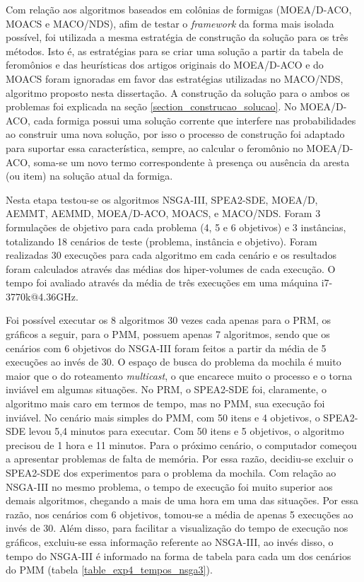 Com relação aos algoritmos baseados em colônias de formigas (MOEA/D-ACO, MOACS e MACO/NDS), afim de testar o \textit{framework} da forma mais isolada possível, foi utilizada a mesma estratégia de construção da solução para os três métodos. Isto é, as estratégias para se criar uma solução a partir da tabela de feromônios e das heurísticas dos artigos originais do MOEA/D-ACO e do MOACS foram ignoradas em favor das estratégias utilizadas no MACO/NDS, algoritmo proposto nesta dissertação. A construção da solução para o ambos os problemas foi explicada na seção \ref{section_construcao_solucao}. No MOEA/D-ACO, cada formiga possui uma solução corrente que interfere nas probabilidades ao construir uma nova solução, por isso o processo de construção foi adaptado para suportar essa característica, sempre, ao calcular o feromônio no MOEA/D-ACO, soma-se um novo termo correspondente à presença ou ausência da aresta (ou item) na solução atual da formiga.

Nesta etapa testou-se os algoritmos NSGA-III, SPEA2-SDE, MOEA/D, AEMMT, AEMMD, MOEA/D-ACO, MOACS, e MACO/NDS. Foram 3 formulações de objetivo para cada problema (4, 5 e 6 objetivos) e 3 instâncias, totalizando 18 cenários de teste (problema, instância e objetivo). Foram realizadas 30 execuções para cada algoritmo em cada cenário e os resultados foram calculados através das médias dos hiper-volumes de cada execução. O tempo foi avaliado através da média de três execuções em uma máquina i7-3770k@4.36GHz.

Foi possível executar os 8 algoritmos 30 vezes cada apenas para o PRM, os gráficos a seguir, para o PMM, possuem apenas 7 algoritmos, sendo que os cenários com 6 objetivos do NSGA-III foram feitos a partir da média de 5 execuções ao invés de 30. O espaço de busca do problema da mochila é muito maior que o do roteamento \textit{multicast}, o que encarece muito o processo e o torna inviável em algumas situações. No PRM, o SPEA2-SDE foi, claramente, o algoritmo mais caro em termos de tempo, mas no PMM, sua execução foi inviável. No cenário mais simples do PMM, com 50 itens e 4 objetivos, o SPEA2-SDE levou 5,4 minutos para executar. Com 50 itens e 5 objetivos, o algoritmo precisou de 1 hora e 11 minutos. Para o próximo cenário, o computador começou a apresentar problemas de falta de memória. Por essa razão, decidiu-se excluir o SPEA2-SDE dos experimentos para o problema da mochila. Com relação ao NSGA-III no mesmo problema, o tempo de execução foi muito superior aos demais algoritmos, chegando a mais de uma hora em uma das situações. Por essa razão, nos cenários com 6 objetivos, tomou-se a média de apenas 5 execuções ao invés de 30. Além disso, para facilitar a visualização do tempo de execução nos gráficos, excluiu-se essa informação referente ao NSGA-III, ao invés disso, o tempo do NSGA-III é informado na forma de tabela para cada um dos cenários do PMM (tabela \ref{table_exp4_tempos_nsga3}).


